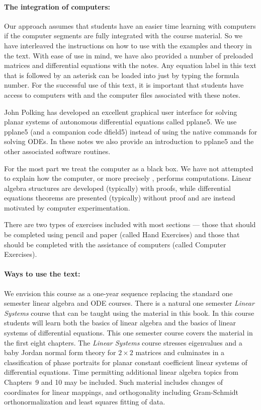 \documentclass{ximera}
\begin{document}
\paragraph{The integration of computers:}  Our approach assumes that students 
have an easier time learning with 
computers if the computer segments are fully integrated with the course 
material.  So we have interleaved the instructions on how to use \Matlab 
with the examples and theory in the text.  With ease of use in mind, we 
have also provided a number of preloaded matrices and differential equations 
with the notes.  Any equation label in this text that is followed by an 
asterisk can be loaded into \Matlab just by typing the formula number.  For 
the successful use of this text, it is important that students have access 
to computers with \Matlab and the computer files associated with these notes.

John Polking has developed an excellent graphical user interface for solving
planar systems of autonomous differential equations called {\sf pplane5}.  
We use {\sf pplane5} (and a companion code 
{\sf dfield5}) instead of using the \Matlab native commands for solving ODEs. 
In these notes we also provide an introduction to {\sf pplane5} and the other 
associated software routines.

For the most part we treat the computer as a black box.  We have not
attempted to explain how the computer, or more precisely \Matlabp, 
performs computations.   Linear algebra structures are developed (typically) 
with proofs, while differential equations theorems are presented (typically) 
without proof and are instead motivated by computer experimentation.  

There are two types of exercises included with most sections --- those that 
should be completed using pencil and paper (called Hand Exercises) and 
those that should be completed with the assistance of computers (called 
Computer Exercises).  

\paragraph{Ways to use the text:}  We envision this course as a one-year 
sequence replacing the standard one semester linear algebra and ODE courses. 
There is a natural one semester {\em Linear Systems\/} course that can be 
taught using the material in this book. In this course students will
learn both the basics of linear algebra and the basics of linear systems of
differential equations.  This one semester course covers the material in the 
first eight chapters.  The {\em Linear Systems\/} course stresses eigenvalues 
and a baby Jordan normal form theory for $2\times 2$ matrices and culminates 
in a classification of phase portraits for planar constant coefficient linear 
systems of differential equations.   Time permitting additional linear 
algebra topics from Chapters~9 and 10 may be included.  Such material 
includes changes of coordinates for linear mappings, and orthogonality 
including Gram-Schmidt orthonormalization and least squares fitting of data.
\end{document}

